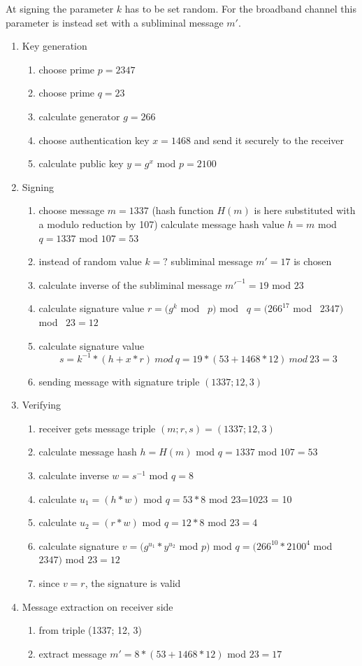 \documentclass{article}
\begin{document}
At signing the parameter ${ k}$ has to be set random. For the broadband channel this parameter is instead set with a subliminal message ${ m'}$.
\begin{enumerate}



\item Key generation
\begin{enumerate}
    \item choose prime ${ p=2347}$
    \item choose prime ${ q=23}$
    \item calculate generator ${ g=266}$
    \item choose authentication key ${ x=1468}$ and send it securely to the receiver
    \item calculate public key ${ y=g^{x}}$ mod ${ p=2100}$
\end{enumerate}
\item Signing
\begin{enumerate}
    \item choose message ${ m=1337}$ (hash function ${ H(m)}$ is here substituted with a modulo reduction by 107) calculate message hash value ${ h=m}$ mod ${ q=1337}$ mod ${ 107=53}$
    \item instead of random value ${ k=?}$ subliminal message ${ m'=17}$ is chosen
    \item calculate inverse of the subliminal message ${ m'^{-1}=19}$ mod ${ 23}$
    \item calculate signature value ${ r=(g^{k}}$ mod \  ${ p)}$ mod \ ${ q=(266^{17}}$ mod \ ${ 2347)}$ mod \ ${ 23=12}$
    \item calculate signature value \[{ s=k^{-1}*(h+x*r)} \ mod \ { q=19*(53+1468*12)}\  mod\  { 23=3}\]
    \item sending message with signature triple ${ (1337;12,3)}$
\end{enumerate}
\item Verifying
\begin{enumerate}
    \item receiver gets message triple ${ (m;r,s)=(1337;12,3)}$
    \item calculate message hash ${ h=H(m)}$ mod ${ q=1337}$ mod ${ 107=53}$
    \item calculate inverse ${ w=s^{-1}}$ mod ${ q=8}$
    \item calculate ${ u_{1}=(h*w)}$ mod ${ q=53*8}$ mod { 23=10}23 = 10
    \item calculate ${ u_{2}=(r*w)}$ mod ${ q=12*8}$ mod ${ 23=4}$
    \item calculate signature ${ v=(g^{u_{1}}*y^{u_{2}}}$ mod ${ p)}$ mod ${ q=(266^{10}*2100^{4}}$ mod ${ 2347)}$ mod ${ 23=12}$
    \item since ${ v=r}$, the signature is valid
\end{enumerate}
\item Message extraction on receiver side
\begin{enumerate}
    \item from triple (1337; 12, 3)
    \item extract message ${ m'=8*(53+1468*12)}$ mod ${ 23=17}$
\end{enumerate}
\end{enumerate}
\end{document}
